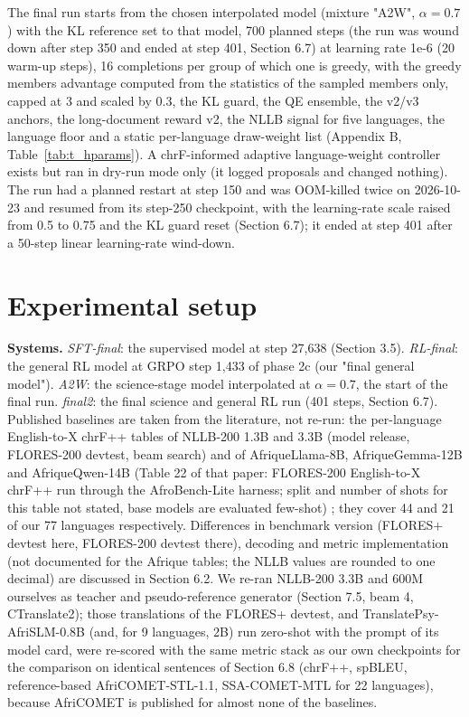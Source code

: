 The final run starts from the chosen interpolated model (mixture "A2W", \(\alpha=0.7\)) with the KL reference set to that model, 700 planned steps (the run was wound down after step 350 and ended at step 401, Section 6.7) at learning rate 1e-6 (20 warm-up steps), 16 completions per group of which one is greedy, with the greedy member\textquotesingle s advantage computed from the statistics of the sampled members only, capped at 3 and scaled by 0.3, the KL guard, the QE ensemble, the v2/v3 anchors, the long-document reward v2, the NLLB signal for five languages, the language floor and a static per-language draw-weight list (Appendix B, Table~\ref{tab:t_hparams}). A chrF-informed adaptive language-weight controller exists but ran in dry-run mode only (it logged proposals and changed nothing). The run had a planned restart at step 150 and was OOM-killed twice on 2026-10-23 and resumed from its step-250 checkpoint, with the learning-rate scale raised from 0.5 to 0.75 and the KL guard reset (Section 6.7); it ended at step 401 after a 50-step linear learning-rate wind-down.

\section{Experimental setup}\label{experimental-setup}

\textbf{Systems.} \emph{SFT-final}: the supervised model at step 27,638 (Section 3.5). \emph{RL-final}: the general RL model at GRPO step 1,433 of phase 2c (our "final general model"). \emph{A2W}: the science-stage model interpolated at \(\alpha=0.7\), the start of the final run. \emph{final2}: the final science and general RL run (401 steps, Section 6.7). Published baselines are taken from the literature, not re-run: the per-language English-to-X chrF++ tables of NLLB-200 1.3B and 3.3B (model release, FLORES-200 devtest, beam search) \citep{nllb2022nllb} and of AfriqueLlama-8B, AfriqueGemma-12B and AfriqueQwen-14B (Table 22 of that paper: FLORES-200 English-to-X chrF++ run through the AfroBench-Lite harness; split and number of shots for this table not stated, base models are evaluated few-shot) \citep{yu2026afriquellm}; they cover 44 and 21 of our 77 languages respectively. Differences in benchmark version (FLORES+ devtest here, FLORES-200 devtest there), decoding and metric implementation (not documented for the Afrique tables; the NLLB values are rounded to one decimal) are discussed in Section 6.2. We re-ran NLLB-200 3.3B and 600M ourselves as teacher and pseudo-reference generator (Section 7.5, beam 4, CTranslate2); those translations of the FLORES+ devtest, and TranslatePsy-AfriSLM-0.8B (and, for 9 languages, 2B) run zero-shot with the prompt of its model card, were re-scored with the same metric stack as our own checkpoints for the comparison on identical sentences of Section 6.8 (chrF++, spBLEU, reference-based AfriCOMET-STL-1.1, SSA-COMET-MTL for 22 languages), because AfriCOMET is published for almost none of the baselines.

